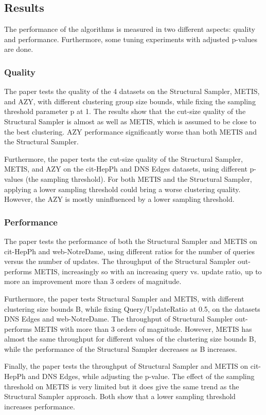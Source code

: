 \documentclass[a4paper,11pt]{article}
\begin{document}
\subsection{Results}
The performance of the algorithms is measured in two different aspects: quality and performance. Furthermore, some tuning experiments with adjusted p-values are done.

\subsubsection{Quality}
The paper tests the quality of the 4 datasets on the Structural Sampler, METIS, and AZY, with different clustering group size bounds, while fixing the sampling threshold parameter p at 1. The results show that the cut-size quality of the Structural Sampler is almost as well as METIS, which is assumed to be close to the best clustering. AZY performance significantly worse than both METIS and the Structural Sampler.

Furthermore, the paper tests the cut-size quality of the Structural Sampler, METIS, and AZY on the cit-HepPh and DNS Edges datasets, using different p-values (the sampling threshold).
For both METIS and the Structural Sampler, applying a lower sampling threshold could bring a worse clustering quality. However, the AZY is mostly uninfluenced by a lower sampling threshold. 

\subsubsection{Performance}
The paper tests the performance of both the Structural Sampler and METIS on cit-HepPh and web-NotreDame, using different ratios for the number of queries versus the number of updates. 
The throughput of the Structural Sampler out-performs METIS, increasingly so with an increasing query vs. update ratio, up to more an improvement more than 3 orders of magnitude.

Furthermore, the paper tests Structural Sampler and METIS, with different clustering size bounds B, while fixing Query/UpdateRatio at 0.5, on the datasets DNS Edges and web-NotreDame.
The throughput of Structural Sampler out-performs METIS with more than 3 orders of magnitude. However, METIS has almost the same throughput for different values of the clustering size bounds B, while the performance of the Structural Sampler decreases as B increases. 

Finally, the paper tests the throughput of Structural Sampler and METIS on cit-HepPh and DNS Edges, while adjusting the p-value. 
The effect of the sampling threshold on METIS is very limited but it does give the same trend as the Structural Sampler approach. Both show that a lower sampling threshold increases performance. 
\end{document}
